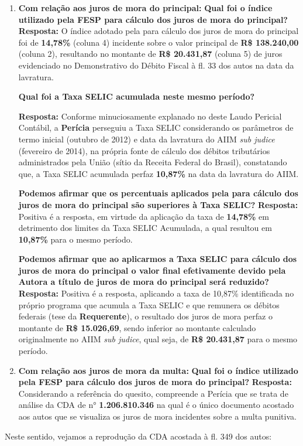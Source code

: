 \begin{enumerate}
    \item \textbf{Com relação aos juros de mora do principal:}
\textbf{Qual foi o índice utilizado pela FESP para cálculo dos juros de mora do principal?}
\textbf{Resposta:} O índice adotado pela \textbf{\shortrequerida} para cálculo dos juros de mora do principal foi de \textbf{14,78\%} (coluna 4) incidente sobre o valor principal de \textbf{R\$ 138.240,00} (coluna 2), resultando no montante de \textbf{R\$ 20.431,87} (coluna 5) de juros evidenciado no Demonstrativo do Débito Fiscal à fl. 33 dos autos na data da lavratura.

\textbf{Qual foi a Taxa SELIC acumulada neste mesmo período?}

\textbf{Resposta:}	Conforme minuciosamente explanado no  deste Laudo Pericial Contábil, a \textbf{Perícia} perseguiu a Taxa SELIC considerando os parâmetros de termo inicial (outubro de 2012) e data da lavratura do AIIM \textit{sub judice} (fevereiro de 2014), na própria fonte de cálculo dos débitos tributários administrados pela União (sítio da Receita Federal do Brasil), constatando que, a Taxa SELIC acumulada perfaz \textbf{10,87\%} na data da lavratura do AIIM. 

\textbf{Podemos afirmar que os percentuais aplicados pela \shortrequerida para cálculo dos juros de mora do principal são superiores à Taxa SELIC?}
\textbf{Resposta:}	Positiva é a resposta, em virtude da aplicação da taxa de \textbf{14,78\%} em detrimento dos limites da Taxa SELIC Acumulada, a qual resultou em \textbf{10,87\%} para o mesmo período.

\textbf{Podemos afirmar que ao aplicarmos a Taxa SELIC para cálculo dos juros de mora do principal o valor final efetivamente devido pela Autora a título de juros de mora do principal será reduzido?}
\textbf{Resposta:}	Positiva é a resposta, aplicando a taxa de 10,87\% identificada no próprio programa que acumula a Taxa SELIC e que remunera os débitos federais (tese da \textbf{Requerente}), o resultado dos juros de mora perfaz o montante de \textbf{R\$ 15.026,69}, sendo inferior ao montante calculado originalmente no AIIM \textit{sub judice}, qual seja, de \textbf{R\$ 20.431,87} para o mesmo período.

    \item \textbf{Com relação aos juros de mora da multa:}
\textbf{Qual foi o índice utilizado pela FESP para cálculo dos juros de mora do principal?}
\textbf{Resposta:} Considerando a referência do quesito, compreende a Perícia que se trata de análise da CDA de n° \textbf{1.206.810.346} na qual é o único documento acostado aos autos que se visualiza os juros de mora incidentes sobre a multa punitiva.
\end{enumerate}
Neste sentido, vejamos a reprodução da CDA acostada à fl. 349 dos autos:


